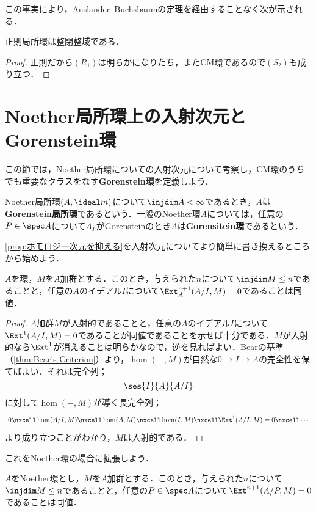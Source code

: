 この事実により，Auslander--Buchsbaumの定理を経由することなく次が示される．
\begin{cor}
	正則局所環は整閉整域である．
\end{cor}

\begin{proof}
	正則だから$(R_1)$は明らかになりたち，またCM環であるので$(S_2)$も成り立つ．
\end{proof}

\section{Noether局所環上の入射次元とGorenstein環}

この節では，Noether局所環についての入射次元について考察し，CM環のうちでも重要なクラスをなす\textbf{Gorenstein環}を定義しよう．
\begin{defi}[Gorenstein環]
	Noether局所環$(A,\ideal m)$について$\injdim A<\infty$であるとき，$A$は\textbf{Gorenstein局所環}であるという．一般のNoether環$A$については，任意の$P\in\spec A$について$A_P$がGorensteinのとき$A$は\textbf{Gorensitein環}であるという．
\end{defi}

\ref{prop:ホモロジー次元を抑える}を入射次元についてより簡単に書き換えるところから始めよう．

\begin{prop}\label{prop:injdimのイデアルによる判定}
	$A$を環，$M$を$A$加群とする．このとき，与えられた$n$について$\injdim M\leq n$であることと，任意の$A$のイデアル$I$について$\Ext^{n+1}_A(A/I,M)=0$であることは同値．
\end{prop}

\begin{proof}
	$A$加群$M$が入射的であることと，任意の$A$のイデアル$I$について$\Ext^1(A/I,M)=0$であることが同値であることを示せば十分である．$M$が入射的なら$\Ext^1$が消えることは明らかなので，逆を見ればよい．Bearの基準（\ref{thm:Bear's Criterion}）より，$\hom(-,M)$が自然な$0\to I\to A$の完全性を保てばよい．それは完全列；
	\[\ses{I}{A}{A/I}\]
	に対して$\hom(-,M)$が導く長完全列；
	\[\begin{tikzcd}
	0\nxcell \hom(A/I,M)\nxcell\hom(A,M)\nxcell\hom(I,M)\nxcell\Ext^1(A/I,M)=0\nxcell\cdots
	\end{tikzcd}\]
	より成り立つことがわかり，$M$は入射的である．
\end{proof}

これをNoether環の場合に拡張しよう．

\begin{prop}\label{prop:Noetherのinjdim判定法}
	$A$をNoether環とし，$M$を$A$加群とする．このとき，与えられた$n$について$\injdim M\leq n$であることと，任意の$P\in\spec A$について$\Ext^{n+1}(A/P,M)=0$であることは同値．
\end{prop}


